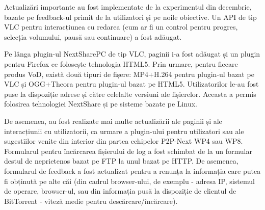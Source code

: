Actualizări importante au fost implementate de la experimentul din decembrie,
bazate pe feedback-ul primit de la utilizatori și pe noile obiective. Un API de tip
VLC pentru interacțiunea cu redarea (cum ar fi un control pentru progres, selecția
volumului, pausă sau continuare) a fost adăugat.

Pe lânga plugin-ul NextSharePC de tip VLC, paginii i-a fost adăugat și un plugin
pentru Firefox ce folosește tehnologia HTML5. Prin urmare, pentru fiecare
produs VoD, există două tipuri de fișere: MP4+H.264 pentru plugin-ul bazat pe
VLC și OGG+Theora pentru plugin-ul bazat pe HTML5. Utilizatorilor le-au fost
puse la dispoziție adrese și către celelalte versiuni ale fișierelor. Aceasta
a permis folosirea tehnologiei NextShare și pe sisteme bazate pe Linux.

De asemenea, au fost realizate mai multe actualizării ale paginii și ale
interacțiunii cu utilizatorii, ca urmare a plugin-ului pentru utilizatori sau
ale sugestiilor venite din interior din partea echipelor P2P-Next WP4 sau WP8.
Formularul pentru încărcarea fișierului de log a fost schimbat de la un formular
destul de neprietenos bazat pe FTP la unul bazat pe HTTP. De asemenea, formularul
de feedback a fost actualizat pentru a renunța la informația care putea fi obținută
pe alte căi (din cadrul browser-ului, de exemplu - adresa IP, sistemul de operare,
browser-ul, sau din informația pusă la dispoziție de clientul de BitTorrent -
viteză medie pentru descărcare/încărcare).

